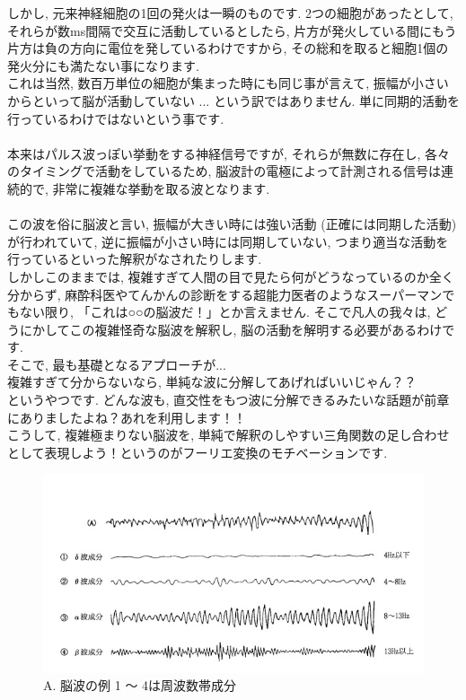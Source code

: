\documentclass[11pt,a4paper]{jreport}
\begin{document}
しかし, 元来神経細胞の1回の発火は一瞬のものです. 2つの細胞があったとして, それらが数ms間隔で交互に活動しているとしたら, 片方が発火している間にもう片方は負の方向に電位を発しているわけですから, その総和を取ると細胞1個の発火分にも満たない事になります. \\
これは当然, 数百万単位の細胞が集まった時にも同じ事が言えて, 振幅が小さいからといって脳が活動していない ... という訳ではありません. 単に同期的活動を行っているわけではないという事です.\\
\\
本来はパルス波っぽい挙動をする神経信号ですが, それらが無数に存在し, 各々のタイミングで活動をしているため, 脳波計の電極によって計測される信号は連続的で, 非常に複雑な挙動を取る波となります. \\
\\
この波を俗に脳波と言い, 振幅が大きい時には強い活動 (正確には同期した活動) が行われていて, 逆に振幅が小さい時には同期していない, つまり適当な活動を行っているといった解釈がなされたりします. \\
しかしこのままでは, 複雑すぎて人間の目で見たら何がどうなっているのか全く分からず, 麻酔科医やてんかんの診断をする超能力医者のようなスーパーマンでもない限り, 「これは○○の脳波だ！」とか言えません. そこで凡人の我々は, どうにかしてこの複雑怪奇な脳波を解釈し, 脳の活動を解明する必要があるわけです.\\

そこで, 最も基礎となるアプローチが...\\
複雑すぎて分からないなら, 単純な波に分解してあげればいいじゃん？？\\ 
というやつです. どんな波も, 直交性をもつ波に分解できるみたいな話題が前章にありましたよね？あれを利用します！！
\\
こうして, 複雑極まりない脳波を, 単純で解釈のしやすい三角関数の足し合わせとして表現しよう！というのがフーリエ変換のモチベーションです.\\

\begin{figure}[H]
\label{im:eeg}
  \centering
  \includegraphics[width=120mm,bb=0 0 600 313]{figures/eeg.jpg}
  \caption{A. 脳波の例 1 ～ 4は周波数帯成分}
\end{figure}
\end{document}
